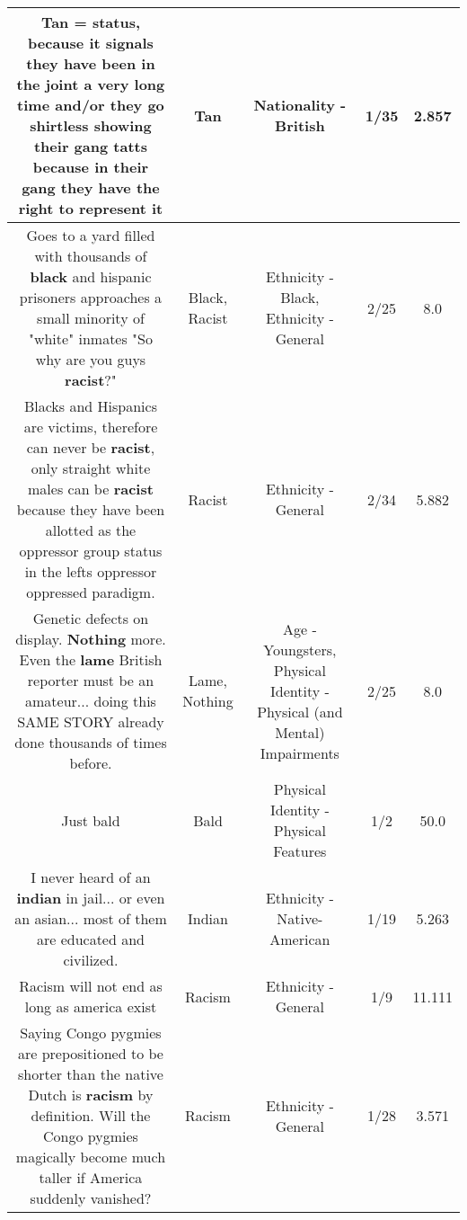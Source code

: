 \documentclass[11pt]{article}
\newlength\mylength
\begin{document}
\begin{center}
\begin{longtable}{|C{.65\mylength}|C{.30\mylength}|C{.12\mylength}|C{.12\mylength}|C{.12\mylength}|}
  \small Tan = status, because it signals they have been in the joint a very long time and/or they go shirtless showing their gang tatts because in their gang they have the right to represent it\normalsize   & Tan & Nationality - British & 1/35 & 2.857 \\  \hline
  \small Goes to a yard filled with thousands of \textbf{black} and hispanic prisoners approaches a small minority of "white" inmates "So why are you guys \textbf{racist}?"\normalsize   & Black, Racist & Ethnicity - Black, Ethnicity - General & 2/25 & 8.0 \\  \hline
  \small Blacks and Hispanics are victims, therefore can never be \textbf{racist}, only straight white males can be \textbf{racist} because they have been allotted as the oppressor group status  in the lefts  oppressor  oppressed paradigm.\normalsize   & Racist & Ethnicity - General & 2/34 & 5.882 \\  \hline
  \small Genetic defects on display. \textbf{Nothing} more. Even the \textbf{lame} British reporter must be an amateur... doing this SAME STORY already done thousands of times before.\normalsize   & Lame, Nothing & Age - Youngsters, Physical Identity - Physical (and Mental) Impairments & 2/25 & 8.0 \\  \hline
  \small Just bald\normalsize   & Bald & Physical Identity - Physical Features & 1/2 & 50.0 \\  \hline
  \small I never heard of an \textbf{indian} in jail... or even an asian... most of them are educated and civilized.\normalsize   & Indian & Ethnicity - Native-American & 1/19 & 5.263 \\  \hline
  \small Racism will not end as long as america exist\normalsize   & Racism & Ethnicity - General & 1/9 & 11.111 \\  \hline
  \small Saying Congo pygmies are prepositioned to be shorter than the native Dutch is \textbf{racism} by definition. Will the Congo pygmies magically become much taller if America suddenly vanished?\normalsize   & Racism & Ethnicity - General & 1/28 & 3.571 \\  \hline

\end{longtable}
\end{center}
\end{document}
